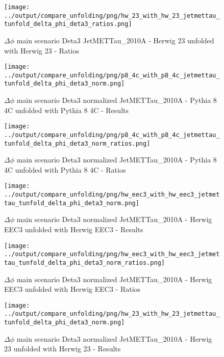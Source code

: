 \documentclass[11pt]{book}
\begin{document}
\begin{figure}[ht]
\centering
\texttt{[image: ../output/compare\_unfolding/png/hw\_23\_with\_hw\_23\_jetmettau\_tunfold\_delta\_phi\_deta3\_ratios.png]}
\caption{$\Delta\phi$ main scenario Deta3 JetMETTau\_2010A - Herwig 23 unfolded with Herwig 23 - Ratios}
\label{hw_23_hw_23_jetmettau_tunfold_delta_phi_deta3_b}
\end{figure}


\begin{figure}[ht]
\centering
\texttt{[image: ../output/compare\_unfolding/png/p8\_4c\_with\_p8\_4c\_jetmettau\_tunfold\_delta\_phi\_deta3\_norm.png]}
\caption{$\Delta\phi$ main scenario Deta3 normalized JetMETTau\_2010A - Pythia 8 4C unfolded with Pythia 8 4C - Results}
\label{p8_p8_jetmettau_tunfold_delta_phi_deta3_norm_a}
\end{figure}

\begin{figure}[ht]
\centering
\texttt{[image: ../output/compare\_unfolding/png/p8\_4c\_with\_p8\_4c\_jetmettau\_tunfold\_delta\_phi\_deta3\_norm\_ratios.png]}
\caption{$\Delta\phi$ main scenario Deta3 normalized JetMETTau\_2010A - Pythia 8 4C unfolded with Pythia 8 4C - Ratios}
\label{p8_p8_jetmettau_tunfold_delta_phi_deta3_norm_b}
\end{figure}

\begin{figure}[ht]
\centering
\texttt{[image: ../output/compare\_unfolding/png/hw\_eec3\_with\_hw\_eec3\_jetmettau\_tunfold\_delta\_phi\_deta3\_norm.png]}
\caption{$\Delta\phi$ main scenario Deta3 normalized JetMETTau\_2010A - Herwig EEC3 unfolded with Herwig EEC3 - Results}
\label{hw_eec3_hw_eec3_jetmettau_tunfold_delta_phi_deta3_norm_a}
\end{figure}

\begin{figure}[ht]
\centering
\texttt{[image: ../output/compare\_unfolding/png/hw\_eec3\_with\_hw\_eec3\_jetmettau\_tunfold\_delta\_phi\_deta3\_norm\_ratios.png]}
\caption{$\Delta\phi$ main scenario Deta3 normalized JetMETTau\_2010A - Herwig EEC3 unfolded with Herwig EEC3 - Ratios}
\label{hw_eec3_hw_eec3_jetmettau_tunfold_delta_phi_deta3_norm_b}
\end{figure}

\begin{figure}[ht]
\centering
\texttt{[image: ../output/compare\_unfolding/png/hw\_23\_with\_hw\_23\_jetmettau\_tunfold\_delta\_phi\_deta3\_norm.png]}
\caption{$\Delta\phi$ main scenario Deta3 normalized JetMETTau\_2010A - Herwig 23 unfolded with Herwig 23 - Results}
\label{hw_23_hw_23_jetmettau_tunfold_delta_phi_deta3_norm_a}
\end{figure}
\end{document}
